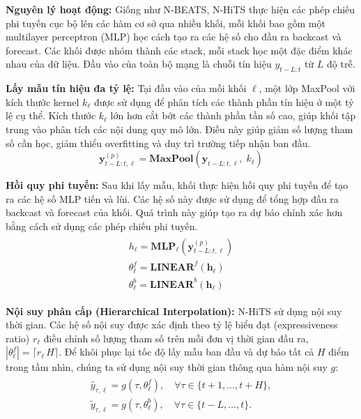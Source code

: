 \textbf{Nguyên lý hoạt động:}
Giống như N-BEATS, N-HiTS thực hiện các phép chiếu phi tuyến cục bộ lên các hàm cơ sở qua nhiều khối, mỗi khối bao gồm một multilayer perceptron (MLP) học cách tạo ra các hệ số cho đầu ra backcast và forecast. Các khối được nhóm thành các stack, mỗi stack học một đặc điểm khác nhau của dữ liệu. Đầu vào của toàn bộ mạng là chuỗi tín hiệu \(y_{t-L:t}\) từ \(L\) độ trễ.

\textbf{Lấy mẫu tín hiệu đa tỷ lệ:}
Tại đầu vào của mỗi khối \(\ell\), một lớp MaxPool với kích thước kernel \(k_{\ell}\) được sử dụng để phân tích các thành phần tín hiệu ở một tỷ lệ cụ thể. Kích thước \(k_{\ell}\) lớn hơn cắt bớt các thành phần tần số cao, giúp khối tập trung vào phân tích các nội dung quy mô lớn. Điều này giúp giảm số lượng tham số cần học, giảm thiểu overfitting và duy trì trường tiếp nhận ban đầu.
\[\mathbf{y}^{(p)}_{t-L:t, \ell} = \mathbf{MaxPool}\left(\mathbf{y}_{t-L:t, \ell},\; k_{\ell}\right)\]

\textbf{Hồi quy phi tuyến:}
Sau khi lấy mẫu, khối thực hiện hồi quy phi tuyến để tạo ra các hệ số MLP tiến và lùi. Các hệ số này được sử dụng để tổng hợp đầu ra backcast và forecast của khối. Quá trình này giúp tạo ra dự báo chính xác hơn bằng cách sử dụng các phép chiếu phi tuyến.
\begin{align*}
\begin{split}
    {h}_{\ell} = \mathbf{MLP}_{\ell}\left(\mathbf{y}^{(p)}_{t-L:t,\ell}\right)\\
    \theta^{f}_{\ell} = \textbf{LINEAR}^{f}\left(\mathbf{h}_{\ell}\right)\\
    \theta^{b}_{\ell} = \textbf{LINEAR}^{b}\left(\mathbf{h}_{\ell}\right)
\end{split}
\end{align*}

\textbf{Nội suy phân cấp (Hierarchical Interpolation):}
N-HiTS sử dụng nội suy thời gian. Các hệ số nội suy được xác định theo tỷ lệ biểu đạt (expressiveness ratio) \(r_{\ell}\) điều chỉnh số lượng tham số trên mỗi đơn vị thời gian đầu ra, $|\theta^{f}_{\ell}|= \lceil r_{\ell} \, H \rceil$. Để khôi phục lại tốc độ lấy mẫu ban đầu và dự báo tất cả $H$ điểm trong tầm nhìn, chúng ta sử dụng nội suy thời gian thông qua hàm nội suy $g$:
\begin{align*}
\begin{split}
    \hat{y}_{\tau,\ell}   = g(\tau, \theta^{f}_{\ell}), \quad \forall \tau \in \{t+1,\dots,t+H\}, \\
    \tilde{y}_{\tau,\ell} = g(\tau, \theta^{b}_{\ell}), \quad \forall \tau \in \{t-L,\dots,t\}. 
\end{split}
\end{align*}
